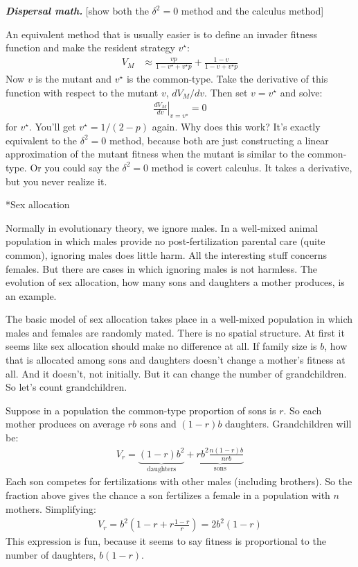 \documentclass[10pt,reqno]{amsbook}
\makeatletter
\renewcommand\subsection{\@startsection{subsection}{2}
\z@{.5\linespacing\@plus.7\linespacing}{-.5em}%
{\normalfont\normalsize\bfseries}}
\numberwithin{equation}{chapter}
\newenvironment{mathbox}[2]
{\begin{table}[#1]
\justify\begin{tcolorbox}[enhanced, oversize]\footnotesize\noindent\textbf{\emph{#2}}}
{\end{tcolorbox}\end{table}}
\makeatother
\begin{document}
\begin{mathbox}{t}{Dispersal math.}
[show both the $\delta^2=0$ method and the calculus method]

An equivalent method that is usually easier is to define an invader fitness function and make the resident strategy $v^\star$:
\begin{align*}
	V_M &\approx \frac{ v p }{1-v^\star + v^\star p } 
	+ \frac{ 1-v }{ 1-v + v^\star p }
\end{align*}
Now $v$ is the mutant and $v^\star$ is the common-type. Take the derivative of this function with respect to the mutant $v$, $dV_M/dv$. Then set $v = v^\star$ and solve:
\begin{align*}
	\left. \frac{d V_M}{dv} \right|_{v=v^\star} = 0
\end{align*}
for $v^\star$. You'll get $v^\star = 1/(2-p)$ again. Why does this work? It's exactly equivalent to the $\delta^2=0$ method, because both are just constructing a linear approximation of the mutant fitness when the mutant is similar to the common-type. Or you could say the $\delta^2=0$ method is covert calculus. It takes a derivative, but you never realize it.

\end{mathbox}


\subsection*{Sex allocation}

Normally in evolutionary theory, we ignore males. In a well-mixed animal population in which males provide no post-fertilization parental care (quite common), ignoring males does little harm. All the interesting stuff concerns females. But there are cases in which ignoring males is not harmless. The evolution of sex allocation, how many sons and daughters a mother produces, is an example.

The basic model of sex allocation takes place in a well-mixed population in which males and females are randomly mated. There is no spatial structure. At first it seems like sex allocation should make no difference at all. If family size is $b$, how that is allocated among sons and daughters doesn't change a mother's fitness at all. And it doesn't, not initially. But it can change the number of grandchildren. So let's count grandchildren.

Suppose in a population the common-type proportion of sons is $r$. So each mother produces on average $rb$ sons and $(1-r)b$ daughters. Grandchildren will be:
\begin{align*}
	V_r = \underbrace{ (1-r)b^2 }_\text{daughters} 
	+ \underbrace{ rb^2 \frac{n(1-r)b}{nrb} }_\text{sons}
\end{align*}
Each son competes for fertilizations with other males (including brothers). So the fraction above gives the chance a son fertilizes a female in a population with $n$ mothers. Simplifying:
\begin{align*}
	V_r = b^2 \left( 1-r
	+  r \frac{1-r}{r} \right) = 2b^2(1-r)
\end{align*}
This expression is fun, because it seems to say fitness is proportional to the number of daughters, $b(1-r)$. 
\end{document}
